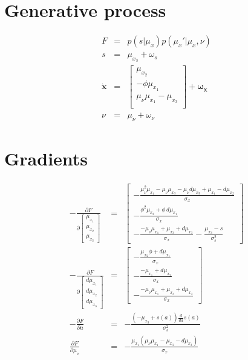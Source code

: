 \documentclass[a4paper]{report}
\begin{document}
\section*{Generative process}

\begin{eqnarray}
  F&=&p(s|\mu_x)p(\mu_x'|\mu_x,\nu)\nonumber\\
  s &=& \mu_{x_3} + \omega_s \nonumber \\
  \dot{\mathbf{x}} &=&
  \left[\begin{array}{c}
  \mu_{x_2} \\
  -\phi\mu_{x_1} \\
  \mu_{\nu}\mu_{x_1} - \mu_{x_3} \\
  \end{array}\right] +\boldsymbol{\omega_x}\nonumber \\
  \nu &=& \mu_{\nu} + \omega_{\nu} \nonumber
\end{eqnarray}

\section*{Gradients}
\begin{eqnarray}
- \frac{\partial F}{\partial
  \left[\begin{matrix}\mu_{x_1}\\\mu_{x_2}\\\mu_{x_3}\end{matrix}\right]} &=&
  \left[\begin{matrix}- \frac{\mu_{\nu}^{2} \mu_{x_1} - \mu_{\nu} \mu_{x_3} -
  \mu_{\nu} d\mu_{x_3} + \mu_{x_1} - d\mu_{x_2}}{\sigma_x}\\- \frac{\phi^{2}\mu_{x_2}
 + \phi\,d\mu_{x_1}}{\sigma_x}\\- \frac{- \mu_{\nu} \mu_{x_1} +
  \mu_{x_3} + d\mu_{x_3}}{\sigma_x} - \frac{\mu_{x_3} -
  s}{\sigma_s^{2}}\end{matrix}\right] \nonumber \\
  - \frac{\partial F}{\partial
    \left[\begin{matrix}d\mu_{x_1}\\d\mu_{x_2}\\d\mu_{x_3}\end{matrix}\right]}
    &=& \left[\begin{matrix}- \frac{\mu_{x_2} \phi + d\mu_{x_1}}{\sigma_x}\\-
    \frac{- \mu_{x_1} + d\mu_{x_2}}{\sigma_x}\\- \frac{- \mu_{\nu} \mu_{x_1} +
    \mu_{x_3} + d\mu_{x_3}}{\sigma_x}\end{matrix}\right] \nonumber\\
    - \frac{\partial F}{\partial a} &=& - \frac{\left(- \mu_{x_3} + s{\left(a
      \right)}\right) \frac{d}{d a} s{\left(a \right)}}{\sigma_s^{2}} \nonumber
      \\ \frac{\partial F}{\partial\mu_{\nu}} &=& - \frac{\mu_{x_1}
      \left(\mu_{\nu} \mu_{x_1} - \mu_{x_3} - d\mu_{x_3}\right)}{\sigma_x}
\end{eqnarray}
\end{document}
